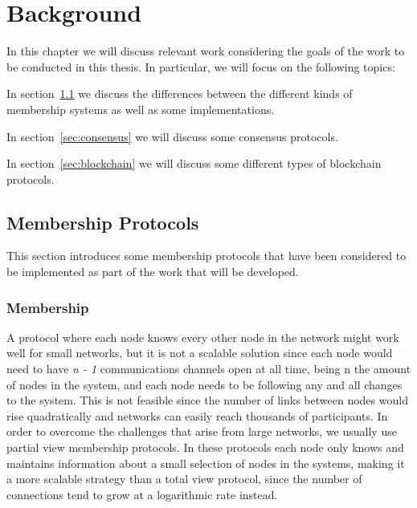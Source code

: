
%

\chapter{Background}\label{cha:Background}

In this chapter we will discuss relevant work considering the goals of the work
to be conducted in this thesis. In particular, we will focus on the following topics:

In section~\ref{sec:membership_protocols} we discuss the differences between
the different kinds of membership systems as well as some implementations.

In section~\ref{sec:consensus} we will discuss some consensus protocols.

In section~\ref{sec:blockchain} we will discuss some different types of
blockchain protocols.

\section{Membership Protocols}\label{sec:membership_protocols}

This section introduces some membership protocols that have been considered to
be implemented as part of the work that will be developed.


\subsection{Membership}\label{sub:membership}

A protocol where each node knows every other node in the network might work well
for small networks, but it is not a scalable solution since each node would need
to have \textit{n - 1} communications channels open at all time, being n the
amount of nodes in the system, and each node needs to be following any and all
changes to the system. This is not feasible since the number of links between
nodes would rise quadratically and networks can easily reach thousands of
participants. In order to overcome the challenges that arise from large networks,
we usually use partial view membership protocols. In these protocols each node only knows
and maintains information about a small selection of nodes in the systems,
making it a more scalable strategy than a total view protocol, since
the number of connections tend to grow at a logarithmic rate instead.

